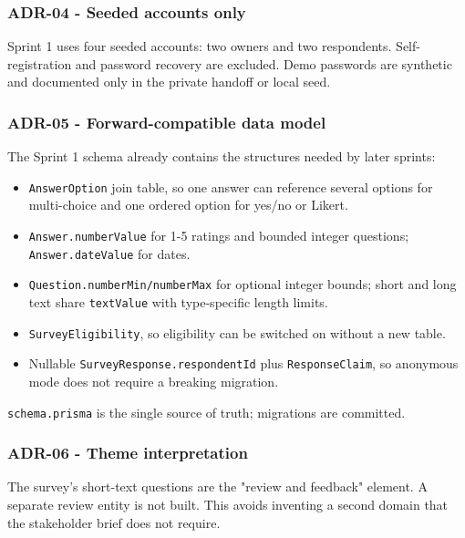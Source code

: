 \documentclass[12pt,a4paper]{article}
\begin{document}
\subsubsection*{ADR-04 - Seeded accounts only}
Sprint 1 uses four seeded accounts: two owners and two respondents. Self-registration and password recovery are excluded. Demo passwords are synthetic and documented only in the private handoff or local seed.

\subsubsection*{ADR-05 - Forward-compatible data model}
The Sprint 1 schema already contains the structures needed by later sprints:

\begin{itemize}[leftmargin=*]
\item \texttt{AnswerOption} join table, so one answer can reference several options for multi-choice and one ordered option for yes/no or Likert.
\item \texttt{Answer.numberValue} for 1-5 ratings and bounded integer questions; \texttt{Answer.dateValue} for dates.
\item \texttt{Question.numberMin/numberMax} for optional integer bounds; short and long text share \texttt{textValue} with type-specific length limits.
\item \texttt{SurveyEligibility}, so eligibility can be switched on without a new table.
\item Nullable \texttt{SurveyResponse.respondentId} plus \texttt{ResponseClaim}, so anonymous mode does not require a breaking migration.
\end{itemize}

\texttt{schema.prisma} is the single source of truth; migrations are committed.

\subsubsection*{ADR-06 - Theme interpretation}
The survey's short-text questions are the "review and feedback" element. A separate review entity is not built. This avoids inventing a second domain that the stakeholder brief does not require.
\end{document}
